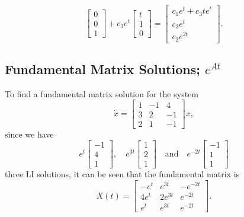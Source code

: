 \begin{example}
\[    \begin{bmatrix}
        0\\0\\1
    \end{bmatrix}+c_3e^{t}
    \begin{bmatrix}
        t\\1\\0
    \end{bmatrix}=
    \begin{bmatrix}
        c_1e^{t}+c_3te^{t}\\ c_3e^{t}\\c_2e^{2t}
    \end{bmatrix}.
    \] 
\end{example}

\subsection{Fundamental Matrix Solutions; $e^{At}$}
\begin{example}
    To find a fundamental matrix solution for the system \[
    \dot x = 
    \begin{bmatrix}
        1 & -1 & 4 \\ 3 & 2 & -1 \\ 2 & 1 & -1
    \end{bmatrix}x,
    \] since we have \[
    e^{t}
    \begin{bmatrix}
        -1 \\ 4 \\1
    \end{bmatrix},\quad e^{3t}
    \begin{bmatrix}
        1 \\ 2 \\ 1
    \end{bmatrix}\quad \text{and} \quad e^{-2t}
    \begin{bmatrix}
        -1 \\ 1 \\ 1
    \end{bmatrix}
    \] three LI solutions, it can be seen that the fundamental matrix is \[
    X(t)=
    \begin{bmatrix}
        -e^{t}& e^{3t} & -e^{-2t}\\
        4e^{t}& 2e^{3t}& e^{-2t}\\
        e^{t}& e^{3t}& e^{-2t}
    \end{bmatrix}.
    \] 
\end{example}
